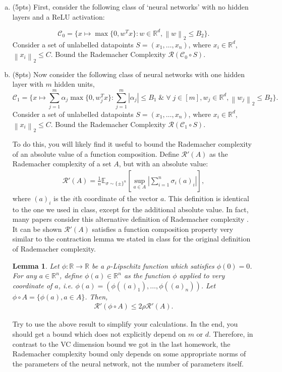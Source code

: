 \documentclass[11pt]{article}
\newcommand{\calC}{{\mathcal{C}}}
\newcommand{\calR}{{\mathcal{R}}}
\newcommand{\blue}[1]{{\color{blue}#1}}
\newcommand{\R}{\mathbb{R}}
\newcommand{\E}{\mathbb{E}}
\newcommand{\twonorm}[1]{\left\| #1\right\|_2}
\newtheorem{lemma}[theorem]{Lemma}
\begin{document}
\begin{enumerate}[(a)] 

\item (\blue{5pts}) First, consider the following class of `neural networks' with no hidden layers and a ReLU activation:

\[
\calC_0 = \{ x \mapsto \max\{0,w^Tx\}: w \in \R^d, \twonorm{w}\le B_2 \}.
\]
Consider a set of unlabelled datapoints $S=(x_1,\dots, x_n)$, where $x_i \in \R^d$, $\twonorm{x_i}\le C$. Bound the Rademacher Complexity $\calR(\calC_0 \circ S) $.

\item (\blue{8pts}) Now consider the following class of neural networks with one hidden layer with $m$ hidden units,
\[
\calC_1 = \{ x \mapsto \sum_{j=1}^m \alpha_j\max\{0,w_j^Tx\}: \sum_{j=1}^m |\alpha_j| \le B_1 \;\& \;\forall\; j \in [m], w_j \in \R^d,  \twonorm{w_j}\le B_2 \}.
\]
Consider a set of unlabelled datapoints $S=(x_1,\dots, x_n)$, where $x_i \in \R^d$, $\twonorm{x_i}\le C$. Bound the Rademacher Complexity $\calR(\calC_1 \circ S) $.

To do this, you will likely find it useful to bound the Rademacher complexity of an absolute value of a function composition. Define $\calR'(A)$ as the Rademacher complexity of a set $A$, but with an absolute value:
\begin{align*}
    \calR'(A) = \frac{1}{n}\E_{\sigma\sim \{\pm\}^n} \left[\sup_{a\in A} \left|\sum_{i=1}^n \sigma_i(a)_i\right|\right],
\end{align*}
where $(a)_i$ is the $i$th coordinate of the vector $a$. This definition is identical to the one we used in class, except for the additional absolute value. In fact, many papers consider this alternative definition of Rademacher complexity \cite{bartlett2002rademacher}. It can be shown $\calR'(A)$ satisfies a function composition property very similar to the contraction lemma we stated in class for the original definition of Rademacher complexity. 

\begin{lemma}\cite{bartlett2002rademacher}
Let $\phi:\R\rightarrow \R$ be a $\rho$-Lipschitz function  which satisfies $\phi(0)=0$. For any $a\in \R^n$, define $\phi(a)\in \R^n$ as the function $\phi$ applied to very coordinate of $a$, i.e. $\phi(a)=(\phi((a)_1),\dots,\phi((a)_n))$. Let $\phi \circ A = \{ \phi(a), a \in A\}$. Then,
\begin{align*}
    \calR'(\phi \circ A) \le 2\rho \calR'(A).
\end{align*}

\end{lemma}
Try to use the above result to simplify your calculations. In the end, you should get a bound which does not explicitly depend on $m$ or $d$. Therefore, in contrast to the VC dimension bound we got in the last homework, the Rademacher complexity bound only depends on some appropriate norms of the parameters of the neural network, not the number of parameters itself.

\end{enumerate}
\end{document}
